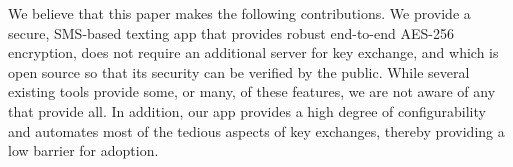 We believe that this paper makes the following contributions. We provide a secure, SMS-based
texting app that provides robust end-to-end AES-256 encryption, does not require an additional
server for key exchange, and which is open source so that its security can be verified by the
public. While several existing tools \cite{textsecure, surespot, bleep, TXTCrypt} provide some,
or many,  of these features, we are not aware of any that provide all. In addition, our app
provides a high degree of configurability and automates most of the tedious aspects of
key exchanges, thereby providing a low barrier for adoption.
